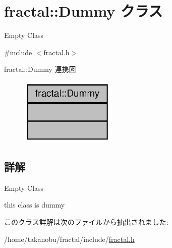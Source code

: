 \section{fractal\+:\+:Dummy クラス}
\label{classfractal_1_1Dummy}


Empty Class  




{\ttfamily \#include $<$fractal.\+h$>$}



fractal\+:\+:Dummy 連携図
\nopagebreak
\begin{figure}[H]
\begin{center}
\leavevmode
\includegraphics[width=128pt]{classfractal_1_1Dummy__coll__graph}
\end{center}
\end{figure}


\subsection{詳解}
Empty Class 

this class is dummy 

このクラス詳解は次のファイルから抽出されました\+:\begin{DoxyCompactItemize}
\item 
/home/takanobu/fractal/include/\hyperlink{fractal_8h}{fractal.\+h}\end{DoxyCompactItemize}
